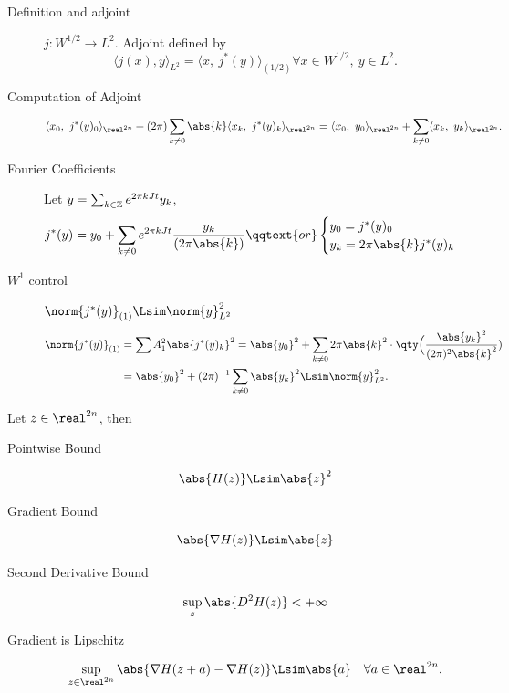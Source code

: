 \documentclass[../main-v2-manifolds.tex]{subfiles}
\begin{document}
\begin{description}
    \item[Definition and adjoint] $j: W^{1/2}\to L^2$. Adjoint defined by
    \[
        \langle j(x), y\rangle_{L^2} = \langle x,\ j^*(y)\rangle_{(1/2)} \forall x\in W^{1/2},\ y\in L^2.
    \]
    \item[Computation of Adjoint]
    \[
        \langle x_0,\ j^*(y)_0\rangle_{\realtn} + (2\pi)\sum_{k\neq 0}\abs{k}\langle x_k,\ j^*(y)_k\rangle_{\realtn}
        = \langle x_0,\ y_0\rangle_{\realtn} + \sum_{k\neq 0}\langle x_k,\ y_k\rangle_{\realtn}.
    \]
    \item[Fourier Coefficients]Let $y = \sum_{k\in\mathbb{Z}} e^{2\pi k J t} y_k$, 
    \[
        j^*(y) = y_0 + \sum_{k\neq 0}\ek \dfrac{y_k}{(2\pi \abs{k})}\qqtext{or} \begin{cases}
            y_0 = j^*(y)_0 \\ 
            y_k = 2\pi \abs{k}j^*(y)_k
        \end{cases}
    \]
    \item[$W^1$ control] $\norm{j^*(y)}_{(1)}\Lsim \norm{y}^2_{L^2}$
    \begin{align*}
        \norm{j^*(y)}_{(1)} &= \sum A_1^2\abs{j^*(y)_k}^2 = \abs{y_0}^2 + \sum_{k\neq 0}2\pi \abs{k}^2 \cdot \qty\Big(\dfrac{\abs{y_k}^2}{(2\pi)^2\abs{k}^2})\\
        &= \abs{y_0}^2 + (2\pi)^{-1}\sum_{k\neq 0}\abs{y_k}^2\Lsim \norm{y}_{L^2}^2.
    \end{align*}
\end{description}
\begin{wts}
    Let $z\in\realtn$, then
    \begin{description}
        \item[Pointwise Bound] 
        \[
            \abs{H(z)}\Lsim \abs{z}^2
        \]
        \item[Gradient Bound]
        \[
            \abs{\nabla H(z)}\Lsim\abs{z}
        \]
        \item[Second Derivative Bound]
        \[
            \sup_{z}\abs{D^2 H(z)} <+\infty
        \]
        \item[Gradient is Lipschitz]
        \[
            \sup_{z\in\realtn}\abs{\nabla H(z + a) - \nabla H(z)}\Lsim\abs{a}\quad\forall a\in\realtn.
        \]
    \end{description}
\end{wts}
\end{document}
